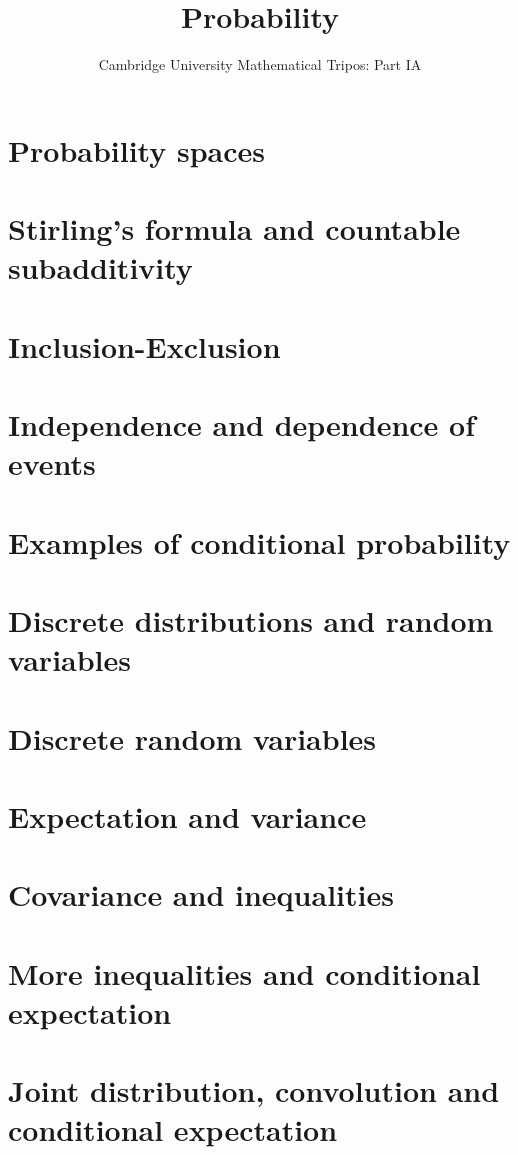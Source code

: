 \documentclass{article}
\title{Probability}
\author{Cambridge University Mathematical Tripos: Part IA}
\begin{document}
\maketitle

\tableofcontentsnewpage{}

\section{Probability spaces}

\section{Stirling's formula and countable subadditivity}

\section{Inclusion-Exclusion}

\section{Independence and dependence of events}

\section{Examples of conditional probability}

\section{Discrete distributions and random variables}

\section{Discrete random variables}

\section{Expectation and variance}

\section{Covariance and inequalities}

\section{More inequalities and conditional expectation}

\section{Joint distribution, convolution and conditional expectation}

\end{document}
